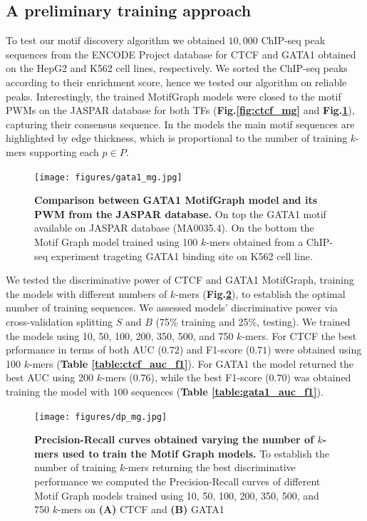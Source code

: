 \documentclass[a4paper, titlepage, openright]{book}
\newcommand{\motifgraph}{MotifGraph\xspace}
\begin{document}
\subsection{A preliminary training approach}
To test our motif discovery algorithm we obtained $10,000$ ChIP-seq peak sequences from the ENCODE Project database \citep{encode2012integrated} for CTCF and GATA1 obtained on the HepG2 and K562 cell lines, respectively. We sorted the ChIP-seq peaks according to their enrichment score, hence we tested our algorithm on reliable peaks. Interestingly, the trained \motifgraph models were closed to the motif PWMs on the JASPAR database \citep{sandelin2004jaspar} for both TFs (\textbf{Fig.\ref{fig:ctcf_mg}} and \textbf{Fig.\ref{fig:gata1_mg}}), capturing their consensus sequence. In the models the main motif sequences are highlighted by edge thickness, which is proportional to the number of training $k$-mers supporting each $p \in P$.
\begin{figure}
	\centering
	\texttt{[image: figures/gata1\_mg.jpg]}
	\caption[Comparison between GATA1 Motif Graph model and its PWM from the JASPAR database.]{\textbf{Comparison between GATA1 MotifGraph model and its PWM from the JASPAR database.} On top the GATA1 motif available on JASPAR database (MA0035.4). On the bottom the Motif Graph model trained using 100 $k$-mers obtained from a ChIP-seq experiment trageting GATA1 binding site on K562 cell line.}
	\label{fig:gata1_mg}
\end{figure} 
We tested the discriminative power of CTCF and GATA1 \motifgraph, training the models with different numbers of $k$-mers (\textbf{Fig.\ref{fig:dp_mg}}), to establish the optimal number of training sequences. We assessed models' discriminative power via cross-validation splitting $S$ and $B$ (75\% training and 25\%, testing). We trained the models using 10, 50, 100, 200, 350, 500, and 750 $k$-mers. For CTCF the best prformance in terms of both AUC ($0.72$) and F1-score ($0.71$) were obtained using 100 $k$-mers (\textbf{Table \ref{table:ctcf_auc_f1}}). For GATA1 the model returned the best AUC using 200 $k$-mers ($0.76$), while the best F1-score ($0.70$) was obtained training the model with $100$ sequences (\textbf{Table \ref{table:gata1_auc_f1}}).
\begin{figure}
	\centering
	\texttt{[image: figures/dp\_mg.jpg]}
	\caption[Precision-Recall curves obtained varying the number of $k$-mers used to train the Motif Graph models.]{\textbf{Precision-Recall curves obtained varying the number of $k$-mers used to train the Motif Graph models.} To establish the number of training $k$-mers returning the best discriminative performance we computed the Precision-Recall curves of different Motif Graph models trained using 10, 50, 100, 200, 350, 500, and 750 $k$-mers on \textbf{(A)} CTCF and \textbf{(B)} GATA1}
	\label{fig:dp_mg}
\end{figure} 
\end{document}
